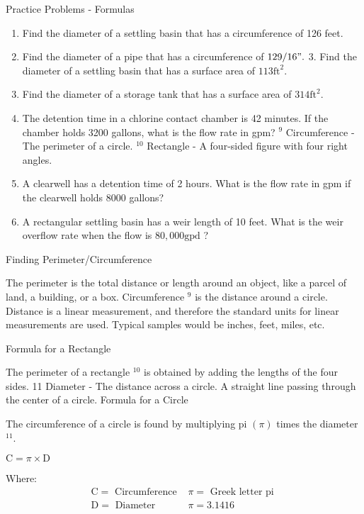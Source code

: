 Practice Problems - Formulas
\begin{enumerate}
  \item Find the diameter of a settling basin that has a circumference of 126 feet.

  \item Find the diameter of a pipe that has a circumference of $129 / 16 " .$ 3. Find the diameter of a settling basin that has a surface area of $113 \mathrm{ft}^{2}$.

  \item Find the diameter of a storage tank that has a surface area of $314 \mathrm{ft}^{2}$.

  \item The detention time in a chlorine contact chamber is 42 minutes. If the chamber holds 3200 gallons, what is the flow rate in gpm? ${ }^{9}$ Circumference - The perimeter of a circle. ${ }^{10}$ Rectangle - A four-sided figure with four right angles.

  \item A clearwell has a detention time of 2 hours. What is the flow rate in gpm if the clearwell holds 8000 gallons?

  \item A rectangular settling basin has a weir length of 10 feet. What is the weir overflow rate when the flow is $80,000 \mathrm{gpd}$ ?

\end{enumerate}
Finding Perimeter/Circumference

The perimeter is the total distance or length around an object, like a parcel of land, a building, or a box. Circumference ${ }^{9}$ is the distance around a circle. Distance is a linear measurement, and therefore the standard units for linear measurements are used. Typical samples would be inches, feet, miles, etc.

Formula for a Rectangle

The perimeter of a rectangle ${ }^{10}$ is obtained by adding the lengths of the four sides. 11 Diameter - The distance across a circle. A straight line passing through the center of a circle. Formula for a Circle

The circumference of a circle is found by multiplying pi $(\pi)$ times the diameter ${ }^{11}$.

$\mathrm{C}=\pi \times \mathrm{D}$

Where:
$$
\begin{array}{ll}
\mathrm{C}=\text { Circumference } & \pi=\text { Greek letter pi } \\
\mathrm{D}=\text { Diameter } & \pi=3.1416
\end{array}
$$\\
